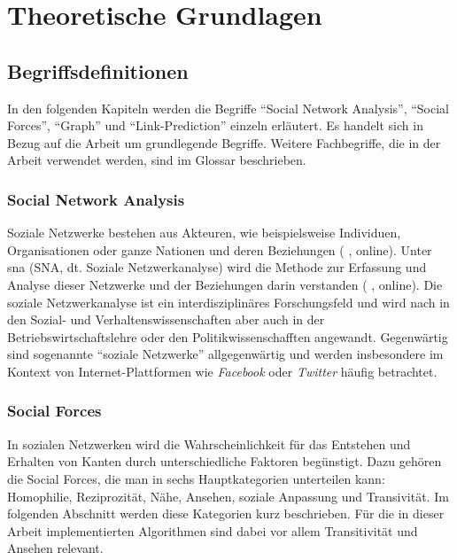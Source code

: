 \chapter{Theoretische Grundlagen}

\section{Begriffsdefinitionen}
In den folgenden Kapiteln werden die Begriffe ``Social Network Analysis'', ``Social Forces'', ``Graph'' und ``Link-Prediction'' einzeln
erläutert. Es handelt sich in Bezug auf die Arbeit um grundlegende Begriffe. Weitere Fachbegriffe, die
in der Arbeit verwendet werden, sind im Glossar beschrieben.

\subsection{Social Network Analysis}
Soziale Netzwerke bestehen aus Akteuren, wie beispielsweise Individuen, Organisationen oder ganze Nationen und deren Beziehungen (\citeauthor{ulrike_baumol_soziale_2019} \citeyear{ulrike_baumol_soziale_2019}, online).
Unter \acl{sna} (SNA, dt. Soziale Netzwerkanalyse) wird die Methode zur Erfassung und Analyse dieser Netzwerke und der Beziehungen darin verstanden (\citeauthor{wikipedia_soziale_2019} \citeyear{wikipedia_soziale_2019}, online).
Die soziale Netzwerkanalyse ist ein interdisziplinäres Forschungsfeld und wird nach \cite{ulrike_baumol_soziale_2019} in den Sozial- und Verhaltenswissenschaften aber auch in der Betriebswirtschaftslehre oder den Politikwissenschafften angewandt.
Gegenwärtig sind sogenannte ``soziale Netzwerke'' allgegenwärtig und werden insbesondere im Kontext von Internet-Plattformen wie \textit{Facebook} oder \textit{Twitter} häufig betrachtet.

\subsection{Social Forces}
\label{socialforces}
In sozialen Netzwerken wird die Wahrscheinlichkeit für das Entstehen und Erhalten von Kanten durch unterschiedliche
Faktoren begünstigt. Dazu gehören die Social Forces, die man in sechs Hauptkategorien unterteilen kann: Homophilie,
Reziprozität, Nähe, Ansehen, soziale Anpassung und Transivität. Im folgenden Abschnitt werden diese Kategorien kurz
beschrieben. Für die in dieser Arbeit implementierten Algorithmen sind dabei vor allem Transitivität und Ansehen
relevant.

